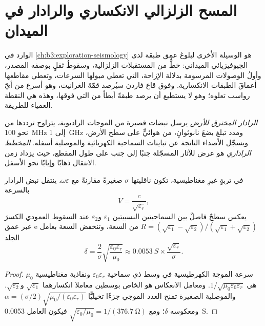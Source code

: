 \section{المسح الزلزالي الانكساري والرادار في الميدان}\label{sec:b3:field-lab-methods-3:radar}

 الوارد في \cref{ch:b3:exploration-seismology}
هو الوسيلة الأخرى لبلوغ عمق طبقة لدى الجيوفيزيائي الميداني: خطٌّ
من المستقبلات الزلزالية، وسقوطُ ثقلٍ بوصفه المصدر، وأولُ الوصولات
المرسومة بدلالة الإزاحة، التي تعطي ميولها السرعات، وتعطي مقاطعها
أعماقَ الطبقات الانكسارية. وفوق قاع فاردن سيُرصد
قمّةَ الغرانيت، وهو أسرع من أيّ رواسب تعلوه؛ وهو
لا يستطيع أن يرصد طبقةً أبطأ من التي فوقها، وهذه هي النقطة العمياء
للطريقة.

\begin{definition}\label{def:b3:field-lab-methods-3:gpr}
\emph{الرادار المخترق للأرض} يرسل
نبضات قصيرة من الموجات الراديوية، يتراوح ترددها من نحو \qty{100}{MHz}
إلى \qty{1}{GHz} ومدد تبلغ بضعَ نانوثوانٍ، من هوائيٍّ على سطح الأرض،
ويسجّل الأصداء الناتجة عن تباينات السماحية الكهربائية
والموصلية أسفله. \emph{المخطط الراداري} هو عرض
للآثار المسجّلة جنبًا إلى جنب على طول المقطع، حيث يزداد زمن
الانتقال ذهابًا وإيابًا نحو الأسفل.
\end{definition}

\begin{proposition}\label{prop:b3:field-lab-methods-3:radar}
في تربةٍ غيرِ مغناطيسية، تكون ناقليتها $\sigma$ صغيرةً مقارنةً
مع $\omega\varepsilon$، ينتقل نبض الرادار بالسرعة
\[
V = \frac{c}{\sqrt{\varepsilon_r}} ,
\]
يعكس سطحٌ فاصلٌ بين السماحيتين النسبيتين $\varepsilon_1$
و$\varepsilon_2$ عند السقوط العمودي الكسرَ $R =
(\sqrt{\varepsilon_1} - \sqrt{\varepsilon_2})/(\sqrt{\varepsilon_1} +
\sqrt{\varepsilon_2})$ من السعة، وتنخفض السعة بعامل
$\mathrm{e}$ عبر عمق الجلد
\[
\delta = \frac{2}{\sigma}\sqrt{\frac{\varepsilon_0\varepsilon_r}{\mu_0}}
       \approx \qty{0.0053}{S}\times\frac{\sqrt{\varepsilon_r}}{\sigma} .
\]
\end{proposition}

\begin{proof}
سرعة الموجة الكهرطيسية في وسط ذي سماحية
$\varepsilon_0\varepsilon_r$ ونفاذية مغناطيسية $\mu_0$ هي
$1/\sqrt{\mu_0\varepsilon_0\varepsilon_r}$. ومعامل الانعكاس
هو الخاص بوسطين معاملا انكسارهما $\sqrt{\varepsilon_1}$
و$\sqrt{\varepsilon_2}$. والموصلية الصغيرة تمنح العدد الموجي
جزءًا تخيليًّا $\alpha = (\sigma/2)\sqrt{\mu_0/(\varepsilon_0
\varepsilon_r)}$ ومعكوسه $\delta$؛ ومع $\sqrt{\varepsilon_0/
\mu_0} = 1/(\qty{376.7}{\ohm})$ فيكون العامل \qty{0.0053}{S}.
\end{proof}


